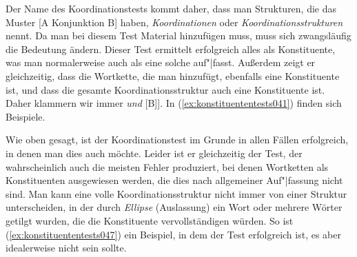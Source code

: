
Der Name des Koordinationstests kommt daher, dass man Strukturen, die das Muster [A Konjunktion B] haben, \textit{Koordinationen} oder \textit{Koordinationsstrukturen} nennt.
Da man bei diesem Test Material hinzufügen muss, muss sich zwangsläufig die Bedeutung ändern.
Dieser Test ermittelt erfolgreich alles als Konstituente, was man normalerweise auch als eine solche auf"|fasst.
Außerdem zeigt er gleichzeitig, dass die Wortkette, die man hinzufügt, ebenfalls eine Konstituente ist, und dass die gesamte Koordinationsstruktur auch eine Konstituente ist.
Daher klammern wir immer \zB [[A] \textit{und} [B]].
In (\ref{ex:konstituententests041}) finden sich Beispiele.

\begin{exe}
  \ex\label{ex:konstituententests041}
  \begin{xlist}
  \end{xlist}
\end{exe}

Wie oben gesagt, ist der Koordinationstest im Grunde in allen Fällen erfolgreich, in denen man dies auch möchte.
Leider ist er gleichzeitig der Test, der wahrscheinlich auch die meisten Fehler produziert, bei denen Wortketten als Konstituenten ausgewiesen werden, die dies nach allgemeiner Auf"|fassung nicht sind.
Man kann eine volle Koordinationsstruktur nicht immer von einer Struktur unterscheiden, in der durch \textit{Ellipse} (Auslassung) ein Wort oder mehrere Wörter getilgt wurden, die die Konstituente vervollständigen würden.
So ist \zB (\ref{ex:konstituententests047}) ein Beispiel, in dem der Test erfolgreich ist, es aber idealerweise nicht sein sollte.

